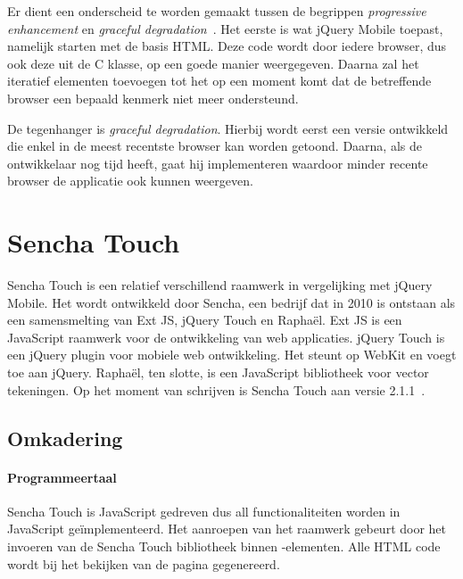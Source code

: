Er dient een onderscheid te worden gemaakt tussen de begrippen \emph{progressive enhancement} en \emph{graceful degradation}~\cite{Hens2012}. 
Het eerste is wat jQuery Mobile toepast, namelijk starten met de basis HTML. Deze code wordt door iedere browser, dus ook deze uit de C klasse, op een goede manier weergegeven. 
Daarna zal het iteratief elementen toevoegen tot het op een moment komt dat de betreffende browser een bepaald kenmerk niet meer ondersteund.

De tegenhanger is \emph{graceful degradation}. 
Hierbij wordt eerst een versie ontwikkeld die enkel in de meest recentste browser kan worden getoond. 
Daarna, als de ontwikkelaar nog tijd heeft, gaat hij  implementeren waardoor minder recente browser de applicatie ook kunnen weergeven.


\section{Sencha Touch}

Sencha Touch is een relatief verschillend raamwerk in vergelijking met jQuery Mobile.  
Het wordt ontwikkeld door Sencha,  een bedrijf dat in 2010 is ontstaan als een samensmelting van Ext JS,  jQuery Touch en Raphaël.  
Ext JS is een JavaScript raamwerk voor de ontwikkeling van web applicaties. 
jQuery Touch is een jQuery plugin voor mobiele web ontwikkeling.  
Het steunt op WebKit en voegt  toe aan jQuery.  
Raphaël,  ten slotte,  is een JavaScript bibliotheek voor vector tekeningen. 
Op het moment van schrijven is Sencha Touch aan versie 2.1.1~\cite{Inc.}.  

\subsection{Omkadering}
\paragraph{Programmeertaal}
Sencha Touch is JavaScript gedreven dus all functionaliteiten worden in JavaScript geïmplementeerd. 
Het aanroepen van het raamwerk gebeurt door het invoeren van de Sencha Touch bibliotheek binnen -elementen.  
Alle HTML code wordt bij het bekijken van de pagina gegenereerd.  

